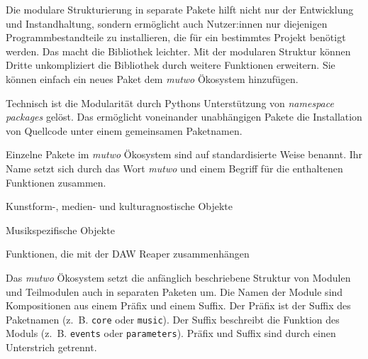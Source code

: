 \documentclass[12pt,a4paper,ngerman]{article}
\begin{document}
\bigskip

Die modulare Strukturierung in separate Pakete hilft nicht nur der Entwicklung und Instandhaltung, sondern ermöglicht auch Nutzer:innen nur diejenigen Programmbestandteile zu installieren, die für ein bestimmtes Projekt benötigt werden.
Das macht die Bibliothek leichter.
Mit der modularen Struktur können Dritte unkompliziert die Bibliothek durch weitere Funktionen erweitern.
Sie können einfach ein neues Paket dem \emph{mutwo} Ökosystem hinzufügen.

\bigskip

Technisch ist die Modularität durch Pythons Unterstützung von \emph{namespace packages} gelöst.
Das ermöglicht voneinander unabhängigen Pakete die Installation von Quellcode unter einem gemeinsamen Paketnamen.

\bigskip

Einzelne Pakete im \emph{mutwo} Ökosystem sind auf standardisierte Weise benannt.
Ihr Name setzt sich durch das Wort \emph{mutwo} und einem Begriff für die enthaltenen Funktionen zusammen.

\bigskip

\hspace{0.5cm}
\begin{minipage}{0.95\textwidth}
    \begin{description}[style=multiline, leftmargin=3.25cm, font=\normalfont\emph]
        \item[mutwo.core] Kunstform-, medien- und kulturagnostische Objekte
        \item[mutwo.music] Musikspezifische Objekte
        \item[mutwo.reaper] Funktionen, die mit der DAW Reaper zusammenhängen
    \end{description}
\end{minipage}

\bigskip

Das \emph{mutwo} Ökosystem setzt die anfänglich beschriebene Struktur von Modulen und Teilmodulen auch in separaten Paketen um.
Die Namen der Module sind Kompositionen aus einem Präfix und einem Suffix.
Der Präfix ist der Suffix des Paketnamen (z.~B. \texttt{core} oder \texttt{music}).
Der Suffix beschreibt die Funktion des Moduls (z.~B. \texttt{events} oder \texttt{parameters}).
Präfix und Suffix sind durch einen Unterstrich getrennt.
\end{document}
